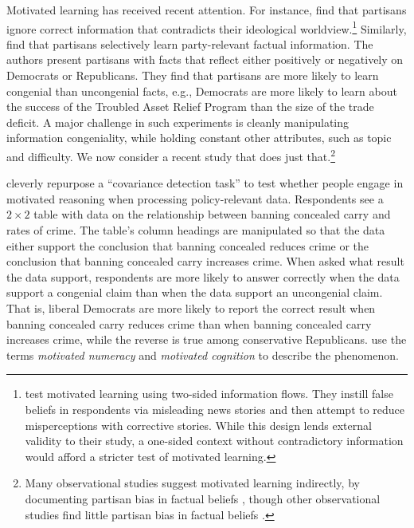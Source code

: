 \documentclass[12pt,letterpaper]{article}
\begin{document}
Motivated learning has received recent attention. For instance, \citet{nyhanreifler2010} find that partisans ignore correct information that contradicts their ideological worldview.\footnote{\citeauthor{nyhanreifler2010} test motivated learning using two-sided information flows. They instill false beliefs in respondents via misleading news stories and then attempt to reduce misperceptions with corrective stories. While this design lends external validity to their study, a one-sided context without contradictory information would afford a stricter test of motivated learning.} Similarly, \citet{jerit2012} find that partisans selectively learn party-relevant factual information. The authors present partisans with facts that reflect either positively or negatively on Democrats or Republicans. They find that partisans are more likely to learn congenial than uncongenial facts, e.g., Democrats are more likely to learn about the success of the Troubled Asset Relief Program than the size of the trade deficit. A major challenge in such experiments is cleanly manipulating information congeniality, while holding constant other attributes, such as topic and difficulty. We now consider a recent study that does just that.\footnote{
Many observational studies suggest motivated learning indirectly, by documenting partisan bias in factual beliefs \citep{bartels2002, shani2006, jerit2012}, though other observational studies find little partisan bias in factual beliefs \citep[e.g.,][]{gaines2007, blais2010}.}

\citet{kahan2017} cleverly repurpose a ``covariance detection task'' \citep[see][]{gilovich1991} to test whether people engage in motivated reasoning when processing policy-relevant data. Respondents see a $2 \times 2$ table with data on the relationship between banning concealed carry and rates of crime. The table's column headings are manipulated so that the data either support the conclusion that banning concealed reduces crime or the conclusion that banning concealed carry increases crime. When asked what result the data support, respondents are more likely to answer correctly when the data support a congenial claim than when the data support an uncongenial claim. That is, liberal Democrats are more likely to report the correct result when banning concealed carry reduces crime than when banning concealed carry increases crime, while the reverse is true among conservative Republicans. \citeauthor{kahan2017} use the terms {\it motivated numeracy} and {\it motivated cognition} to describe the phenomenon.
\end{document}
